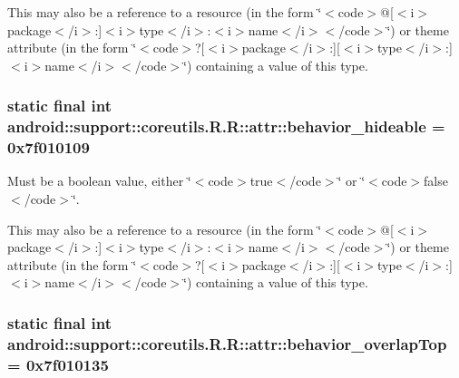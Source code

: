 This may also be a reference to a resource (in the form \char`\"{}$<$code$>$@\mbox{[}$<$i$>$package$<$/i$>$:\mbox{]}$<$i$>$type$<$/i$>$:$<$i$>$name$<$/i$>$$<$/code$>$\char`\"{}) or theme attribute (in the form \char`\"{}$<$code$>$?\mbox{[}$<$i$>$package$<$/i$>$:\mbox{]}\mbox{[}$<$i$>$type$<$/i$>$:\mbox{]}$<$i$>$name$<$/i$>$$<$/code$>$\char`\"{}) containing a value of this type. \hypertarget{classandroid_1_1support_1_1coreutils_1_1_r_1_1attr_83f1b0092123bfa31978da14fae0ceea}{
\subsubsection[{behavior\_\-hideable}]{\setlength{\rightskip}{0pt plus 5cm}static final int android::support::coreutils.R.R::attr::behavior\_\-hideable = 0x7f010109}}
\label{classandroid_1_1support_1_1coreutils_1_1_r_1_1attr_83f1b0092123bfa31978da14fae0ceea}


Must be a boolean value, either \char`\"{}$<$code$>$true$<$/code$>$\char`\"{} or \char`\"{}$<$code$>$false$<$/code$>$\char`\"{}. 

This may also be a reference to a resource (in the form \char`\"{}$<$code$>$@\mbox{[}$<$i$>$package$<$/i$>$:\mbox{]}$<$i$>$type$<$/i$>$:$<$i$>$name$<$/i$>$$<$/code$>$\char`\"{}) or theme attribute (in the form \char`\"{}$<$code$>$?\mbox{[}$<$i$>$package$<$/i$>$:\mbox{]}\mbox{[}$<$i$>$type$<$/i$>$:\mbox{]}$<$i$>$name$<$/i$>$$<$/code$>$\char`\"{}) containing a value of this type. \hypertarget{classandroid_1_1support_1_1coreutils_1_1_r_1_1attr_123011d94148cf8cb6383341d2ee128d}{
\subsubsection[{behavior\_\-overlapTop}]{\setlength{\rightskip}{0pt plus 5cm}static final int android::support::coreutils.R.R::attr::behavior\_\-overlapTop = 0x7f010135}}
\label{classandroid_1_1support_1_1coreutils_1_1_r_1_1attr_123011d94148cf8cb6383341d2ee128d}


